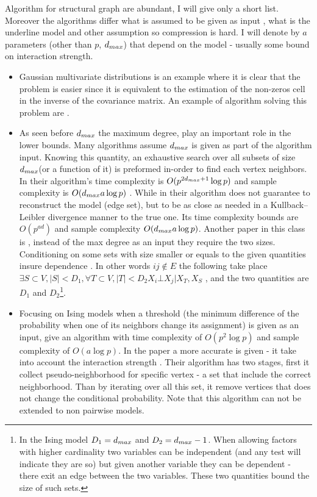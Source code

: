 Algorithm for structural graph are abundant, I will give only a short list.
Moreover the algorithms differ what is assumed to be given as input , what is the underline model and other assumption so compression is hard.
I will denote by $a$ parameters (other than $p$, $d_{max}$) that depend on the model - usually some bound on interaction strength.
 \begin{itemize}
    \item Gaussian multivariate distributions  is an example where it is clear that the problem is easier since it  is equivalent to the estimation of the non-zeros cell in the inverse of the covariance matrix. An example of algorithm solving this problem are \cite{meinshausen2006high,yuan2007model, friedman2008sparse}. 
    \item As seen before $d_{max}$ the maximum degree, play an important role in the lower bounds. Many algorithms \cite{bresler2008reconstruction, abbeel2006learning} assume  $d_{max}$ is given as  part of the algorithm input. Knowing this quantity, an exhaustive search over all subsets of size $d_{max}$(or a function of it) is preformed in-order to find each vertex neighbors.  In\cite{bresler2008reconstruction} their algorithm's time complexity is $O(p^{2d_{max}+1}\log p)$ and sample complexity is $O(d_{max} a \log p)$ . While in \cite{abbeel2006learning} their algorithm does not guarantee to reconstruct the model (edge set), but to be as close as needed in a Kullback–Leibler divergence manner to the true one. Its time complexity bounds are $O(p^{a d})$ and sample complexity $O(d_{max} a \log p)$. Another paper in this class is \cite{wu2013learning},  instead of the max degree as an input they require the two sizes. Conditioning on some sets with size smaller or equals to the given quantities insure dependence . In other words $ij \not \in E$ the following take place $\exists S \subset V, |S|< D_1, \forall T \subset V, |T|<D_2    X_i \bot X_j | X_T, X_S$ , and the two quantities are $D_1$ and $D_2$\footnote{In the Ising model $D_1 = d_{max}$ and $D_2 = d_{max} -1$. When allowing factors with higher cardinality two variables can be independent (and any test will indicate they are so) but given another variable they can be dependent - there exit an edge between the two variables. These two quantities bound the size of such sets. }. 
    \item Focusing on Ising models when a threshold (the minimum difference of the probability when one of its neighbors change its assignment) is given as an input,  \cite{bresler2015efficiently} give an algorithm with time complexity of $O(p^2\log p)$ and sample complexity of $O( a \log p)$. In the paper a more accurate is given -  it take into account the interaction strength . Their algorithm has two stages,  first it collect pseudo-neighborhood for specific vertex - a set that include the correct neighborhood. Than by iterating over all this set, it remove vertices that does not change the conditional probability. Note that this algorithm can not be extended to non pairwise models.

\end{itemize}
